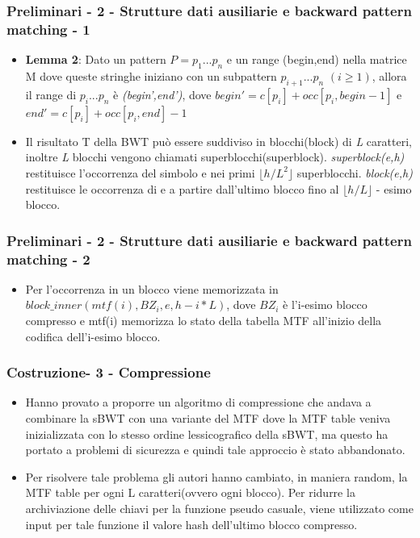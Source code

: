 \documentclass{beamer}
\begin{document}
\begin{frame}
\frametitle{Preliminari - 2 - Strutture dati ausiliarie e backward pattern matching - 1}
	\begin{itemize}
		\item \textbf{Lemma 2}:  Dato un pattern  $ P = p_{1}...p_{n} $  e un range (begin,end) nella matrice M dove queste stringhe iniziano con un subpattern $ p_{i+1}...p_{n} $ $ (i \geq  1) $, allora il range di $ p_{i}...p_{n} $ è \textit{(begin',end')}, dove $ begin' = c[p_{i}]+occ[p_{i},begin-1] $ e $ end' = c[p_{i}]+occ[p_{i},end] -1 $\pause
		\item Il risultato T della BWT può essere suddiviso in blocchi(block) di \textit{L} caratteri, inoltre \textit{L} blocchi vengono chiamati superblocchi(superblock). \textit{superblock(e,h)} restituisce l'occorrenza del simbolo e nei primi $ \lfloor h/L^{2} \rfloor $ superblocchi. \textit{block(e,h)} restituisce le occorrenza di e a partire dall’ultimo blocco fino al  $ \lfloor h/L \rfloor $ - esimo blocco. 
	\end{itemize}
\end{frame}

\begin{frame}
\frametitle{Preliminari - 2 - Strutture dati ausiliarie e backward pattern matching - 2}
	\begin{itemize}
		\item Per l'occorrenza in un blocco viene memorizzata in $ block\_inner(mtf(i),BZ_{i},e,h-i*L) $, dove $ BZ_{i} $ è l’i-esimo blocco compresso e mtf(i) memorizza lo stato della tabella MTF all’inizio della codifica dell'i-esimo blocco.	
	\end{itemize}
\end{frame}

\begin{frame}
\frametitle{Costruzione- 3 - Compressione}
	\begin{itemize}
		\item Hanno provato a proporre un algoritmo di compressione che andava a combinare la sBWT con una variante del MTF dove la MTF table veniva inizializzata con lo stesso ordine lessicografico della sBWT, ma questo ha portato a problemi di sicurezza e quindi tale approccio è stato abbandonato.\pause
		\item Per risolvere tale problema gli autori hanno cambiato, in maniera random, la MTF table per ogni L caratteri(ovvero ogni blocco). Per ridurre la archiviazione delle chiavi per la funzione pseudo casuale, viene utilizzato come input per tale funzione il valore hash dell'ultimo blocco compresso.
	\end{itemize}
\end{frame}
\end{document}
